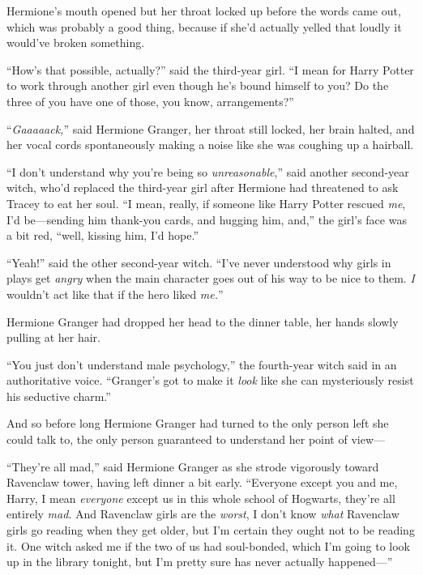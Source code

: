 Hermione’s mouth opened but her throat locked up before the words came out, which was probably a good thing, because if she’d actually yelled that loudly it would’ve broken something.

“How’s that possible, actually?” said the third-year girl. “I mean for Harry Potter to work through another girl even though he’s bound himself to you? Do the three of you have one of those, you know, arrangements?”

“\emph{Gaaaaack,}” said Hermione Granger, her throat still locked, her brain halted, and her vocal cords spontaneously making a noise like she was coughing up a hairball.


“I don’t understand why you’re being so \emph{unreasonable},” said another second-year witch, who’d replaced the third-year girl after Hermione had threatened to ask Tracey to eat her soul. “I mean, really, if someone like Harry Potter rescued \emph{me}, I’d be—sending him thank-you cards, and hugging him, and,” the girl’s face was a bit red, “well, kissing him, I’d hope.”

“Yeah!” said the other second-year witch. “I’ve never understood why girls in plays get \emph{angry} when the main character goes out of his way to be nice to them. \emph{I} wouldn’t act like that if the hero liked \emph{me.}”

Hermione Granger had dropped her head to the dinner table, her hands slowly pulling at her hair.

“You just don’t understand male psychology,” the fourth-year witch said in an authoritative voice. “Granger’s got to make it \emph{look} like she can mysteriously resist his seductive charm.”


And so before long Hermione Granger had turned to the only person left she could talk to, the only person guaranteed to understand her point of view—

“They’re all mad,” said Hermione Granger as she strode vigorously toward Ravenclaw tower, having left dinner a bit early. “Everyone except you and me, Harry, I mean \emph{everyone} except us in this whole school of Hogwarts, they’re all entirely \emph{mad}. And Ravenclaw girls are the \emph{worst}, I don’t know \emph{what} Ravenclaw girls go reading when they get older, but I’m certain they ought not to be reading it. One witch asked me if the two of us had soul-bonded, which I’m going to look up in the library tonight, but I’m pretty sure has never actually happened—”

